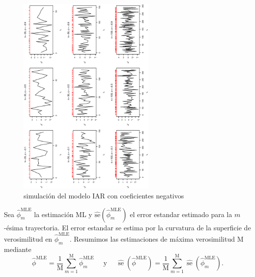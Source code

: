 \begin{figure}[h]
    \includegraphics[width=0.6\textwidth, angle = 270]{Kap3/Fig_Cap3/sim22.eps}
    \caption{simulación del modelo IAR con coeficientes negativos}
    \label{fig:sim2}
\end{figure}

Sea $\hat{\phi}_m^{\mathrm{MLE}}$ la estimación ML y $\widehat{\mathrm{se}}\left(\hat{\phi}_m^{\mathrm{MLE}}\right)$ el error estandar estimado para la  $m$-ésima trayectoria.
El error estandar se estima por la curvatura de la superficie de verosimilitud en $\hat{\phi}_m^{\mathrm{MLE}}$. 
Resumimos las estimaciones de máxima verosimilitud M mediante
$$
\hat{\phi}^{\mathrm{MLE}}=\frac{1}{\mathrm{M}} \sum_{m=1}^{\mathrm{M}} \hat{\phi}_m^{\mathrm{MLE}} \quad \text { y } \quad \widehat{\operatorname{se}}\left(\hat{\phi}^{\mathrm{MLE}}\right)=\frac{1}{\mathrm{M}} \sum_{m=1}^{\mathrm{M}} \widehat{\operatorname{se}}\left(\hat{\phi}_m^{\mathrm{MLE}}\right) .
$$

